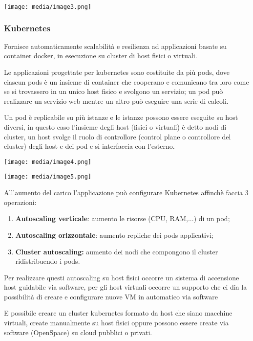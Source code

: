 \texttt{[image: media/image3.png]}

\subsubsection{Kubernetes}\label{kubernetes}

Fornisce automaticamente scalabilità e resilienza ad applicazioni basate
su container docker, in esecuzione su cluster di host fisici o virtuali.

Le applicazioni progettate per kubernetes sono costituite da più pods,
dove ciascun pods è un insieme di container che cooperano e comunicano
tra loro come se si trovassero in un unico host fisico e svolgono un
servizio; un pod può realizzare un servizio web mentre un altro può
eseguire una serie di calcoli.

Un pod è replicabile su più istanze e le istanze possono essere eseguite
su host diversi, in questo caso l'insieme degli host (fisici o virtuali)
è detto nodi di cluster, un host svolge il ruolo di controllore (control
plane o controllore del cluster) degli host e dei pod e si interfaccia
con l'esterno.

\texttt{[image: media/image4.png]}

\texttt{[image: media/image5.png]}

All'aumento del carico l'applicazione può configurare Kubernetes
affinchè faccia 3 operazioni:

\begin{enumerate}
\def\labelenumi{\arabic{enumi}.}
\item
  \textbf{Autoscaling verticale}: aumento le risorse (CPU, RAM,...) di
  un pod;
\item
  \textbf{Autoscaling orizzontale}: aumento repliche dei pods
  applicativi;
\item
  \textbf{Cluster autoscaling:} aumento dei nodi che compongono il
  cluster ridistribuendo i pods.
\end{enumerate}

Per realizzare questi autoscaling su host fisici occorre un sistema di
accensione host guidabile via software, per gli host virtuali occorre un
supporto che ci dia la possibilità di creare e configurare nuove VM in
automatico via software

E\textquotesingle{} possibile creare un cluster kubernetes formato da
host che siano macchine virtuali, create manualmente su host fisici
oppure possono essere create via software (OpenSpace) su cloud pubblici
o privati.

